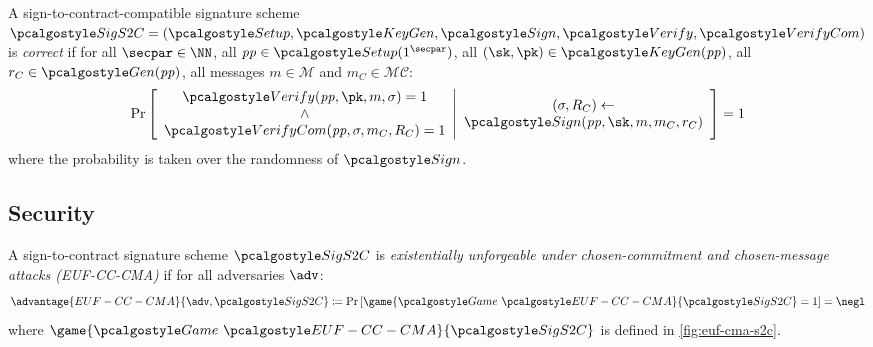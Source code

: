 \begin{definition}[Correctness]\label{def:s2c-correctness}
  A sign-to-contract-compatible signature scheme $\algo{SigS2C} = (\algo{Setup}, \algo{KeyGen}, \algo{Sign}, \algo{Verify}, \algo{VerifyCom})$ is \emph{correct} if for all $\secpar \in \NN$, all $\params \in \algo{Setup}(1^\secpar)$, all $(\sk, \pk) \in \algo{KeyGen}(\params)$, all $r_C \in \algo{Gen}(\params)$, all messages $m \in \mathcal{M}$ and $m_C \in \mathcal{MC}$:
  \[
    \Pr\left[
    \begin{array}{c}
      \algo{Verify}(\params, \pk, m, \sigma) = 1 \\
      \wedge \\
      \algo{VerifyCom}(\params, \sigma, m_C, R_C) = 1
    \end{array}
    \middle|
    \begin{array}{c}
      (\sigma, R_C) \gets \\
      \algo{Sign}(\params, \sk, m, m_C, r_C)
    \end{array}
    \right] = 1
  \]
  where the probability is taken over the randomness of $\algo{Sign}$.
\end{definition}

\subsection{Security}

\begin{definition}\label{def:euf-cma-s2c}
  A sign-to-contract signature scheme $\algo{SigS2C}$ is \emph{existentially unforgeable under chosen-commitment and chosen-message attacks (EUF-CC-CMA)} if for all \ppt adversaries $\adv$:
  \[
    \advantage{EUF-CC-CMA}{\adv, \algo{SigS2C}} \defeq \pr{\game{\Game~\algo{EUF-CC-CMA}}{\algo{SigS2C}} = 1} = \negl
  \]
  where $\game{\Game~\algo{EUF-CC-CMA}}{\algo{SigS2C}}$ is defined in \autoref{fig:euf-cma-s2c}.
\end{definition}

